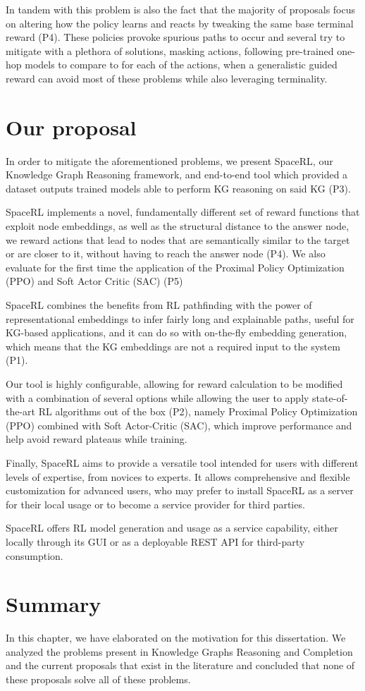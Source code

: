 In tandem with this problem is also the fact that the majority of proposals focus on altering how the policy learns and reacts by tweaking the same base terminal reward (P4). These policies provoke spurious paths to occur and several \cite{cui2023incorporating, lin2018multi, xian2019reinforcement} try to mitigate with a plethora of solutions, masking actions, following pre-trained one-hop models to compare to for each of the actions, when a generalistic guided reward can avoid most of these problems while also leveraging terminality.

\section{Our proposal}\label{sec:moti-proposal}
In order to mitigate the aforementioned problems, we present SpaceRL, our Knowledge Graph Reasoning framework, and end-to-end tool which provided a dataset outputs trained models able to perform KG reasoning on said KG (P3).

SpaceRL implements a novel, fundamentally different set of reward functions that exploit node embeddings, as well as the structural distance to the answer node, we reward actions that lead to nodes that are semantically similar to the target or are closer to it, without having to reach the answer node (P4). We also evaluate for the first time the application of the Proximal Policy Optimization (PPO) and Soft Actor Critic (SAC) (P5)

SpaceRL combines the benefits from RL pathfinding with the power of representational embeddings to infer fairly long and explainable paths, useful for KG-based applications, and it can do so with on-the-fly embedding generation, which means that the KG embeddings are not a required input to the system (P1).

Our tool is highly configurable, allowing for reward calculation to be modified with a combination of several options while allowing the user to apply state-of-the-art RL algorithms out of the box (P2), namely Proximal Policy Optimization (PPO)\cite{schulman2017proximal} combined with Soft Actor-Critic (SAC)\cite{haarnoja2018soft}, which improve performance and help avoid reward plateaus while training.

Finally, SpaceRL aims to provide a versatile tool intended for users with different levels of expertise, from novices to experts. It allows comprehensive and flexible customization for advanced users, who may prefer to install SpaceRL as a server for their local usage or to become a service provider for third parties.

SpaceRL offers RL model generation and usage as a service capability, either locally through its GUI or as a deployable REST API for third-party consumption. 

\section{Summary}\label{sec:moti-summary}
In this chapter, we have elaborated on the motivation for this dissertation. We analyzed the problems present in Knowledge Graphs Reasoning and Completion and the current proposals that exist in the literature and concluded that none of these proposals solve all of these problems.